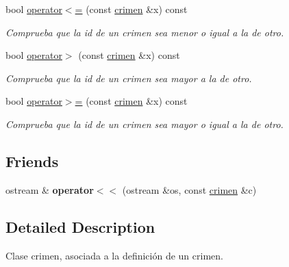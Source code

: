 \begin{DoxyCompactItemize}
bool \hyperlink{classcrimen_a90e290f1e6b20a177e405638a9cfe6b5}{operator$<$=} (const \hyperlink{classcrimen}{crimen} \&x) const 
\begin{DoxyCompactList}\small\item\em Comprueba que la id de un crimen sea menor o igual a la de otro. \end{DoxyCompactList}\item 
bool \hyperlink{classcrimen_ad0e1ff280d7899e9c7191b4bfc799e9d}{operator$>$} (const \hyperlink{classcrimen}{crimen} \&x) const 
\begin{DoxyCompactList}\small\item\em Comprueba que la id de un crimen sea mayor a la de otro. \end{DoxyCompactList}\item 
bool \hyperlink{classcrimen_ab03dccbe20f893bc466facb72b1ce77a}{operator$>$=} (const \hyperlink{classcrimen}{crimen} \&x) const 
\begin{DoxyCompactList}\small\item\em Comprueba que la id de un crimen sea mayor o igual a la de otro. \end{DoxyCompactList}\end{DoxyCompactItemize}
\subsection*{Friends}
\begin{DoxyCompactItemize}
\item 
\hypertarget{classcrimen_a473837c1b23b379a482d1b63c00679ad}{ostream \& {\bfseries operator$<$$<$} (ostream \&os, const \hyperlink{classcrimen}{crimen} \&c)}\label{classcrimen_a473837c1b23b379a482d1b63c00679ad}

\end{DoxyCompactItemize}


\subsection{Detailed Description}
Clase crimen, asociada a la definición de un crimen. 

